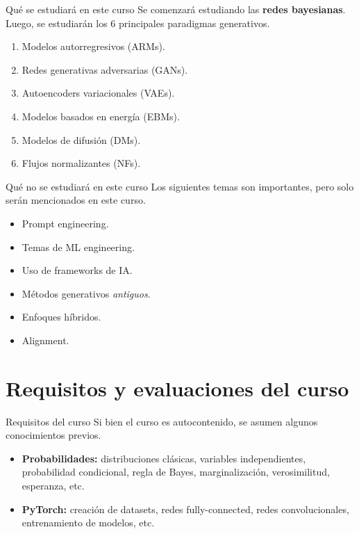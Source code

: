\documentclass{beamer}
\begin{document}
\begin{frame}{Qué se estudiará en este curso}
    Se comenzará estudiando las \textbf{redes bayesianas}. Luego, se estudiarán los 6 principales paradigmas generativos.
    \begin{enumerate}
        \item<2> Modelos autorregresivos (ARMs).
        \item<3> Redes generativas adversarias (GANs).
        \item<4> Autoencoders variacionales (VAEs).
        \item<5> Modelos basados en energía (EBMs).
        \item<6> Modelos de difusión (DMs).
        \item<7> Flujos normalizantes (NFs).
    \end{enumerate}
\end{frame}

\begin{frame}{Qué no se estudiará en este curso}
    Los siguientes temas son importantes, pero solo serán mencionados en este curso.
    \begin{itemize}
        \item<2> Prompt engineering.
        \item<3> Temas de ML engineering.
        \item<4> Uso de frameworks de IA.
        \item<5> Métodos generativos \textit{antiguos}.
        \item<6> Enfoques híbridos.
        \item<7> Alignment.
    \end{itemize}
\end{frame}

\section{Requisitos y evaluaciones del curso}

\begin{frame}{Requisitos del curso}
    Si bien el curso es autocontenido, se asumen algunos conocimientos previos.
    \begin{itemize}
        \item<2,4> \textbf{Probabilidades:} distribuciones clásicas, variables independientes, probabilidad condicional, regla de Bayes, marginalización, verosimilitud, esperanza, etc.
        \item<3,4> \textbf{PyTorch:} creación de datasets, redes fully-connected, redes convolucionales, entrenamiento de modelos, etc.
    \end{itemize}
\end{frame}
\end{document}
